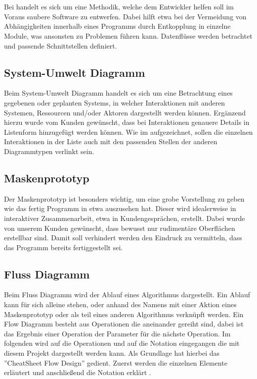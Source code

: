 
\section{\textFlowDesign}

Bei \textFlowDesign{} handelt es sich um eine Methodik, welche dem Entwickler helfen soll
im Voraus saubere Software zu entwerfen. Dabei hilft \textFlowDesign{} etwa bei der
Vermeidung von Abhängigkeiten innerhalb eines Programms durch Entkopplung in einzelne
Module, was ansonsten zu Problemen führen kann.
Datenflüsse werden betrachtet und passende Schnittstellen definiert.

\subsection{System-Umwelt Diagramm}
Beim System-Umwelt Diagramm handelt es sich um eine Betrachtung eines gegebenen oder geplanten Systems, in welcher Interaktionen mit anderen Systemen, Ressourcen und/oder Aktoren dargestellt werden können. Ergänzend hierzu wurde vom Kunden gewünscht, dass bei Interaktionen genauere Details in Listenform hinzugefügt werden können.
Wie im  aufgezeichnet, sollen die einzelnen Interaktionen in der Liste auch mit den passenden Stellen der anderen Diagrammtypen verlinkt sein.


\subsection{Maskenprototyp}
Der Maskenprototyp ist besonders wichtig, um eine grobe Vorstellung zu geben wie das fertig Programm in etwa auszusehen hat. Dieser wird idealerweise in interaktiver Zusammenarbeit, etwa in Kundengesprächen, erstellt. Dabei wurde von unserem Kunden gewünscht, dass bewusst nur rudimentäre Oberflächen erstellbar sind. Damit soll verhindert werden den Eindruck zu vermitteln, dass das Programm bereits fertiggestellt sei.

\subsection{Fluss Diagramm}

Beim Fluss Diagramm wird der Ablauf eines Algorithmus dargestellt. Ein Ablauf kann für sich alleine stehen, oder
anhand des Namens mit einer Aktion eines Maskenprototyp oder als teil eines anderen Algorithmus verknüpft werden.
Ein Flow Diagramm besteht aus Operationen die aneinander gereiht sind, dabei ist das Ergebnis einer Operation der
Parameter für die nächste Operation.
Im folgenden wird auf die Operationen und auf die Notation eingegangen die mit diesem Projekt dargestellt werden kann.
Als Grundlage hat hierbei das ''CheatSheet Flow Design''\cite{flowDesign} gedient. Zuerst werden die einzelnen
Elemente erläutert  und anschließend die Notation erklärt
.

